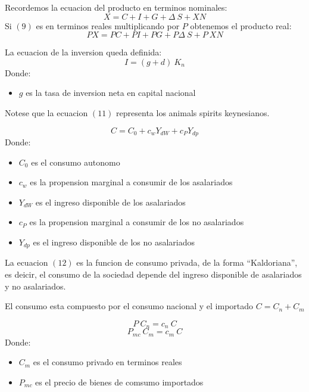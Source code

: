 \documentclass[
  ignorenonframetext,
]{beamer}
\begin{document}
\begin{frame}{}
\label{section-2}
Recordemos la ecuacion del producto en terminos nominales: \[
X=C+I+G+\Delta\ S+XN \tag{9}
\] Si \((9)\) es en terminos reales multiplicando por \(P\) obtenemos el
producto real: \[
PX=PC+PI+PG+P \Delta\ S+P\ XN \tag{10}
\]

La ecuacion de la inversion queda definida: \[
I=(g+d)\ K_n \tag{11}
\] Donde:

\begin{itemize}
  \item[\textbullet] $g$ es la tasa de inversion neta en capital nacional
\end{itemize}

Notese que la ecuacion \((11)\) representa los animals spirits
keynesianos.
\end{frame}

\begin{frame}{}
\label{section-3}
\[
C=C_0+c_wY_{dW}+c_PY_{dp}
\tag{12}
\] Donde:

\begin{itemize}
 \item[\textbullet]$C_0$ es el consumo autonomo
 \item[\textbullet]$c_w$ es la propension marginal a consumir de los asalariados
 \item[\textbullet]$Y_{dW}$ es el ingreso disponible de los asalariados
 \item[\textbullet]$c_P$ es la propension marginal a consumir de los no asalariados
 \item[\textbullet]$Y_{dp}$ es el ingreso disponible de los no asalariados
\end{itemize}

La ecuacion \((12)\) es la funcion de consumo privada, de la forma
``Kaldoriana'', es deicir, el consumo de la sociedad depende del ingreso
disponible de asalariados y no asalariados.
\end{frame}

\begin{frame}{}
\label{section-4}
El consumo esta compuesto por el consumo nacional y el importado
\(C=C_n+C_m\)

\[
P\ C_n=c_n\ C
\tag{13}
\] \[
P_{mc}\ C_m=c_m\ C
\tag{14}
\] Donde:

\begin{itemize}
  \item[\textbullet] $C_m$ es el consumo privado en terminos reales
  \item[\textbullet] $P_{mc}$ es el precio de bienes de comsumo importados
\end{itemize}
\end{frame}
\end{document}
